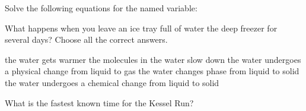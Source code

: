 \documentclass[11pt,addpoints]{exam}   	%
\begin{document}
\begin{questions}
\vspace{.2in}

\question Solve the following equations for the named variable:
\pagebreak

\question[5] What happens when you leave an ice tray full of water the deep freezer for several days?
Choose all the correct answers.

\begin{choices}
\choice the water gets warmer
\choice the molecules in the water slow down
\choice the water undergoes a physical change from liquid to gas
\choice the water changes phase from liquid to solid
\choice the water undergoes a chemical change from liquid to solid
\end{choices}
\vspace{.2in}

\question[1] 
What is the fastest known time for the Kessel Run?


\end{questions}
\end{document}
